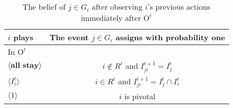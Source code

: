 \documentclass[12pt,letter]{article}
\newcommand{\Kappa}{\mathrm{K}}
\newcommand{\Omicron}{\mathrm{O}}
\theoremstyle{definition}
\theoremstyle{remark}
\theoremstyle{claim}
\begin{document}
%

\begin{table}[!htbp]
\caption{The belief of $j\in G_i$ after observing $i$'s previous actions immediately after $\Omicron^t$ }
\label{Table_blf_up_rpt}
\begin{center}
\begin{tabular}{l | c}
 $i$ plays  		&	 The event $j\in G_i$ assigns with probability one \\
\hline
\hline
 In $\Omicron^t$		&					 \\
\hline
$\langle \textbf{all stay} \rangle$  &     $i\notin R^t$ and $I^{t+1}_{ji}=I^t_j$ \\
$\langle I^t_{i} \rangle$  &     $i\in R^t$ and $I^{t+1}_{ji}=I^t_j\cap I^t_{i}$ \\
$\langle 1 \rangle$  & 	  $i$ is pivotal    \\
  \hline
\end{tabular}
\end{center}
\end{table}
\end{document}
